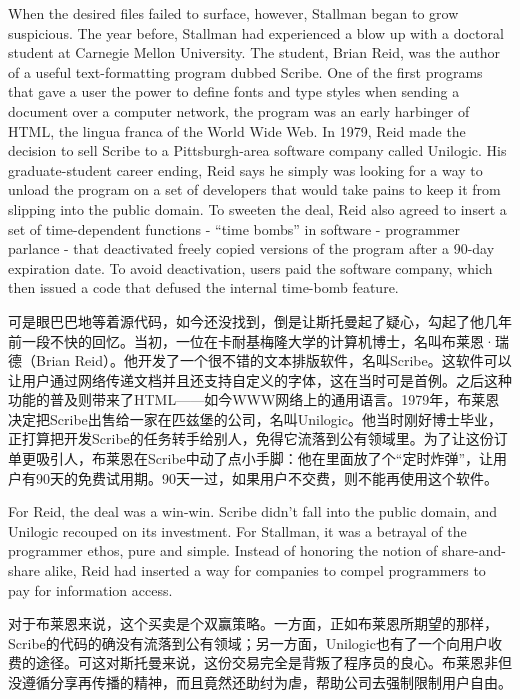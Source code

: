 \ifdefined\eng
When the desired files failed to surface, however, Stallman began to grow suspicious. The year before, Stallman had experienced a blow up with a doctoral student at Carnegie Mellon University. The student, Brian Reid, was the author of a useful text-formatting program dubbed Scribe. One of the first programs that gave a user the power to define fonts and type styles when sending a document over a computer network, the program was an early harbinger of HTML, the lingua franca of the World Wide Web. In 1979, Reid made the decision to sell Scribe to a Pittsburgh-area software company called Unilogic. His graduate-student career ending, Reid says he simply was looking for a way to unload the program on a set of developers that would take pains to keep it from slipping into the public domain. To sweeten the deal, Reid also agreed to insert a set of time-dependent functions - ``time bombs'' in software - programmer parlance - that deactivated freely copied versions of the program after a 90-day expiration date. To avoid deactivation, users paid the software company, which then issued a code that defused the internal time-bomb feature.
\fi

\ifdefined\chs
可是眼巴巴地等着源代码，如今还没找到，倒是让斯托曼起了疑心，勾起了他几年前一段不快的回忆。当初，一位在卡耐基梅隆大学的计算机博士，名叫布莱恩·瑞德（Brian Reid）。他开发了一个很不错的文本排版软件，名叫Scribe。这软件可以让用户通过网络传递文档并且还支持自定义的字体，这在当时可是首例。之后这种功能的普及则带来了HTML——如今WWW网络上的通用语言。1979年，布莱恩决定把Scribe出售给一家在匹兹堡的公司，名叫Unilogic。他当时刚好博士毕业，正打算把开发Scribe的任务转手给别人，免得它流落到公有领域里。为了让这份订单更吸引人，布莱恩在Scribe中动了点小手脚：他在里面放了个``定时炸弹''，让用户有90天的免费试用期。90天一过，如果用户不交费，则不能再使用这个软件。
\fi

\ifdefined\eng
For Reid, the deal was a win-win. Scribe didn't fall into the public domain, and Unilogic recouped on its investment. For Stallman, it was a betrayal of the programmer ethos, pure and simple. Instead of honoring the notion of share-and-share alike, Reid had inserted a way for companies to compel programmers to pay for information access.
\fi

\ifdefined\chs
对于布莱恩来说，这个买卖是个双赢策略。一方面，正如布莱恩所期望的那样，Scribe的代码的确没有流落到公有领域；另一方面，Unilogic也有了一个向用户收费的途径。可这对斯托曼来说，这份交易完全是背叛了程序员的良心。布莱恩非但没遵循分享再传播的精神，而且竟然还助纣为虐，帮助公司去强制限制用户自由。
\fi

